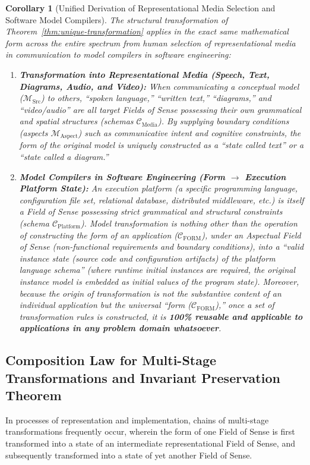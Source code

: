 \documentclass[11pt,a4paper]{article}
\theoremstyle{definition}
\theoremstyle{plain}
\newtheorem{corollary}{Corollary}[section]
\theoremstyle{remark}
\newcommand{\CFORM}{\mathcal{C}_{\mathrm{FORM}}}
\newcommand{\MSrc}{\mathcal{M}_{\mathrm{Src}}}
\newcommand{\MAspect}{\mathcal{M}_{\mathrm{Aspect}}}
\begin{document}
\begin{corollary}[Unified Derivation of Representational Media Selection and Software Model Compilers]\label{cor:media-and-compilers}
The structural transformation of Theorem~\ref{thm:unique-transformation} applies in the exact same mathematical form across the entire spectrum from human selection of representational media in communication to model compilers in software engineering:

\begin{enumerate}
    \item \textbf{Transformation into Representational Media (Speech, Text, Diagrams, Audio, and Video):}
    When communicating a conceptual model ($\MSrc$) to others, ``spoken language,'' ``written text,'' ``diagrams,'' and ``video/audio'' are all target Fields of Sense possessing their own grammatical and spatial structures (schemas $\mathcal{C}_{\mathrm{Media}}$). By supplying boundary conditions (aspects $\MAspect$) such as communicative intent and cognitive constraints, the form of the original model is uniquely constructed as a ``state called text'' or a ``state called a diagram.''
    \item \textbf{Model Compilers in Software Engineering (Form $\to$ Execution Platform State):}
    An execution platform (a specific programming language, configuration file set, relational database, distributed middleware, etc.) is itself a Field of Sense possessing strict grammatical and structural constraints (schema $\mathcal{C}_{\mathrm{Platform}}$). Model transformation is nothing other than the operation of constructing the form of an application ($\CFORM$), under an Aspectual Field of Sense (non-functional requirements and boundary conditions), into a ``valid instance state (source code and configuration artifacts) of the platform language schema'' (where runtime initial instances are required, the original instance model is embedded as initial values of the program state). Moreover, because the origin of transformation is not the substantive content of an individual application but the universal ``form ($\CFORM$),'' once a set of transformation rules is constructed, it is \textbf{100\% reusable and applicable to applications in any problem domain whatsoever}.
\end{enumerate}
\end{corollary}

\subsection{Composition Law for Multi-Stage Transformations and Invariant Preservation Theorem}
In processes of representation and implementation, chains of multi-stage transformations frequently occur, wherein the form of one Field of Sense is first transformed into a state of an intermediate representational Field of Sense, and subsequently transformed into a state of yet another Field of Sense.
\end{document}
